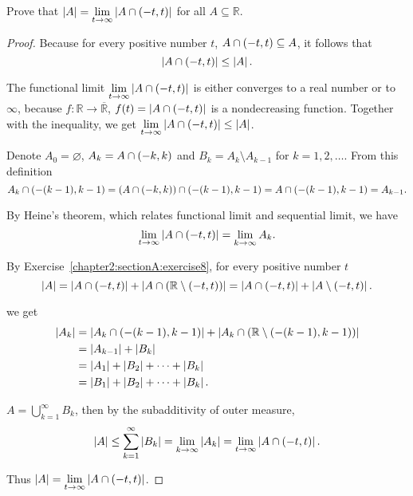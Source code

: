 \begin{exercise}\label{chapter2:sectionA:exercise9}
    Prove that $\left\vert{A}\right\vert = \lim\limits_{t\to\infty} \left\vert{A\cap\left({-t, t}\right)}\right\vert$ for all $A\subseteq \mathbb{R}$.
\end{exercise}

\begin{proof}
    Because for every positive number $t$, $A\cap \left({-t, t}\right)\subseteq A$, it follows that
    \[
        \left\vert{A\cap \left({-t, t}\right)}\right\vert \leq \left\vert{A}\right\vert.
    \]

    The functional limit $\lim\limits_{t\to\infty} \left\vert{A\cap\left({-t, t}\right)}\right\vert$ is either converges to a real number or to $\infty$, because $f: \mathbb{R}\to \overline{\mathbb{R}}$, $f(t) = \left\vert{A\cap\left({-t, t}\right)}\right\vert$ is a nondecreasing function. Together with the inequality, we get $\lim\limits_{t\to\infty} \left\vert{A\cap\left({-t, t}\right)}\right\vert \leq \left\vert{A}\right\vert$.

    Denote $A_{0} = \varnothing$, $A_{k} = A\cap \left({-k, k}\right)$ and $B_{k} = A_{k}\setminus A_{k-1}$ for $k = 1, 2, \ldots$. From this definition
    \[
        A_{k}\cap\left({-(k-1), k-1}\right) = (A\cap\left({-k, k}\right))\cap\left({-(k-1), k-1}\right) = A\cap\left({-(k-1), k-1}\right) = A_{k-1}.
    \]

    By Heine's theorem, which relates functional limit and sequential limit, we have
    \[
        \lim\limits_{t\to\infty}\left\vert{A\cap\left({-t, t}\right)}\right\vert = \lim\limits_{k\to\infty}A_{k}.
    \]

    By Exercise~\ref{chapter2:sectionA:exercise8}, for every positive number $t$
    \[
        \left\vert{A}\right\vert = \left\vert{A\cap \left({-t, t}\right)}\right\vert + \left\vert{A\cap(\mathbb{R}\setminus \left({-t, t}\right))}\right\vert = \left\vert{A\cap \left({-t, t}\right)}\right\vert + \left\vert{A\setminus \left({-t, t}\right)}\right\vert.
    \]

    we get
    \begin{align*}
        \left\vert{A_{k}}\right\vert & = \left\vert{A_{k}\cap \left({-(k-1), k-1}\right)}\right\vert + \left\vert{A_{k}\cap (\mathbb{R}\setminus \left({-(k-1), k-1}\right))}\right\vert \\
                    & = \left\vert{A_{k-1}}\right\vert + \left\vert{B_{k}}\right\vert                                                                                   \\
                    & = \left\vert{A_{1}}\right\vert + \left\vert{B_{2}}\right\vert + \cdots + \left\vert{B_{k}}\right\vert                                                              \\
                    & = \left\vert{B_{1}}\right\vert + \left\vert{B_{2}}\right\vert + \cdots + \left\vert{B_{k}}\right\vert.
    \end{align*}

    $A = \bigcup^{\infty}_{k=1}B_{k}$, then by the subadditivity of outer measure,
    \[
        \left\vert{A}\right\vert\leq \sum^{\infty}_{k=1}\left\vert{B_{k}}\right\vert = \lim\limits_{k\to\infty}\left\vert{A_{k}}\right\vert = \lim\limits_{t\to\infty}\left\vert{A\cap\left({-t, t}\right)}\right\vert.
    \]

    Thus $\left\vert{A}\right\vert = \lim\limits_{t\to\infty}\left\vert{A\cap\left({-t, t}\right)}\right\vert$.
\end{proof}
\newpage

